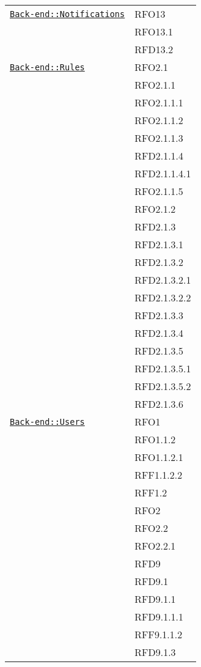 \begin{longtable}{|>{\centering}m{10cm}|m{3cm}<{\centering}|}
\hyperref[Back-end::Notifications]{\texttt{Back-end::Notifications}} & RFO13\\
& RFO13.1\\
& RFD13.2\\ \hline

\hyperref[Back-end::Rules]{\texttt{Back-end::Rules}} & RFO2.1\\
& RFO2.1.1\\
& RFO2.1.1.1\\
& RFO2.1.1.2\\
& RFO2.1.1.3\\
& RFD2.1.1.4\\
& RFD2.1.1.4.1\\
& RFO2.1.1.5\\
& RFO2.1.2\\
& RFD2.1.3\\
& RFD2.1.3.1\\
& RFD2.1.3.2\\
& RFD2.1.3.2.1\\
& RFD2.1.3.2.2\\
& RFD2.1.3.3\\
& RFD2.1.3.4\\
& RFD2.1.3.5\\
& RFD2.1.3.5.1\\
& RFD2.1.3.5.2\\
& RFD2.1.3.6\\ \hline

\hyperref[Back-end::Users]{\texttt{Back-end::Users}} & RFO1\\
& RFO1.1.2\\
& RFO1.1.2.1\\
& RFF1.1.2.2\\
& RFF1.2\\
& RFO2\\
& RFO2.2\\
& RFO2.2.1\\
& RFD9\\
& RFD9.1\\
& RFD9.1.1\\
& RFD9.1.1.1\\
& RFF9.1.1.2\\
& RFD9.1.3\\ \hline


\end{longtable}
